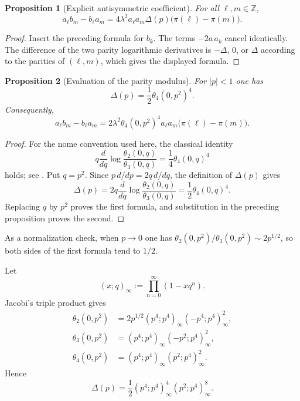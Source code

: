 \documentclass[11pt]{article}
\newtheorem{proposition}{Proposition}[section]
\numberwithin{equation}{section}
\begin{document}
\begin{proposition}[Explicit antisymmetric coefficient]
For all $\ell,m\in\mathbb Z$,
\begin{equation}
\boxed{
a_\ell b_m-b_\ell a_m
=4\lambda^2a_\ell a_m\Delta(p)
\bigl(\pi(\ell)-\pi(m)\bigr).}
\end{equation}
\end{proposition}

\begin{proof}
Insert the preceding formula for $b_k$. The terms $-2a\,a_k$ cancel identically. The difference of the two parity logarithmic derivatives is $-\Delta$, $0$, or $\Delta$ according to the parities of $(\ell,m)$, which gives the displayed formula.
\end{proof}

\begin{proposition}[Evaluation of the parity modulus]
For $|p|<1$ one has
\begin{equation}
\boxed{\Delta(p)=\frac12\theta_4(0,p^2)^4.}
\end{equation}
Consequently,
\begin{equation}
\boxed{
a_\ell b_m-b_\ell a_m
=2\lambda^2\theta_4(0,p^2)^4a_\ell a_m
\bigl(\pi(\ell)-\pi(m)\bigr).}
\end{equation}
\end{proposition}
\begin{proof}
For the nome convention used here, the classical identity
\begin{equation}
q\frac{d}{dq}\log\frac{\theta_2(0,q)}{\theta_3(0,q)}
=\frac14\theta_4(0,q)^4
\end{equation}
holds; see \cite[Sec.~20.7(vii)]{DLMFTheta}.  Put $q=p^2$.  Since
$p\,d/dp=2q\,d/dq$, the definition of $\Delta(p)$ gives
\begin{equation}
\Delta(p)=2q\frac{d}{dq}\log\frac{\theta_2(0,q)}{\theta_3(0,q)}
=\frac12\theta_4(0,q)^4.
\end{equation}
Replacing $q$ by $p^2$ proves the first formula, and substitution in the
preceding proposition proves the second.
\end{proof}

As a normalization check, when $p\to0$ one has
$\theta_2(0,p^2)/\theta_3(0,p^2)\sim2p^{1/2}$, so both sides of the first
formula tend to $1/2$.

Let
\begin{equation}
(x;q)_\infty:=\prod_{n=0}^\infty(1-xq^n).
\end{equation}
Jacobi's triple product gives
\begin{equation}
\begin{aligned}
\theta_2(0,p^2)&=2p^{1/2}(p^4;p^4)_\infty(-p^4;p^4)_\infty^2,\\
\theta_3(0,p^2)&=(p^4;p^4)_\infty(-p^2;p^4)_\infty^2,\\
\theta_4(0,p^2)&=(p^4;p^4)_\infty(p^2;p^4)_\infty^2.
\end{aligned}
\end{equation}
Hence
\begin{equation}
\boxed{\Delta(p)=\frac12
(p^4;p^4)_\infty^4(p^2;p^4)_\infty^8.}
\end{equation}
\end{document}
